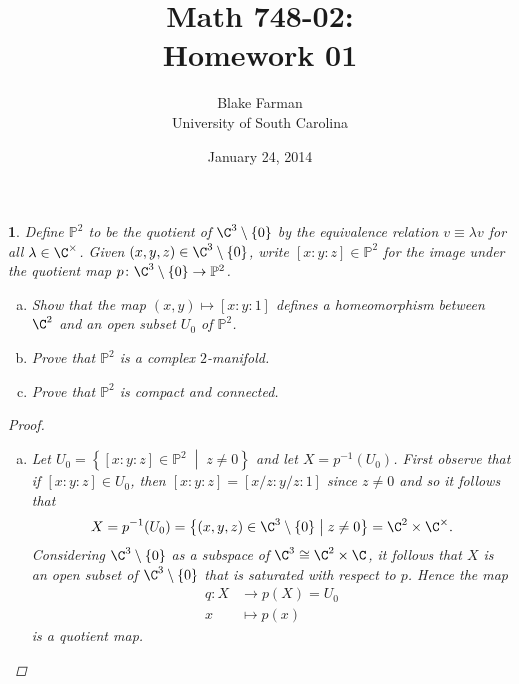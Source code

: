 \documentclass[10pt]{amsart}
\author{Blake Farman\\University of South Carolina}
\title{Math 748-02:\\Homework 01}
\date{January 24, 2014}
\begin{document}
\maketitle

\providecommand{\p}{\mathfrak{p}}
\providecommand{\m}{\mathfrak{m}}
\providecommand{\Deck}[1]{\operatorname{Deck}\left(#1\right)}

\newtheorem{thm}{}
\newtheorem{lem}{Lemma}
\newtheorem{prop}{Proposition}
\theoremstyle{definition}
\newtheorem{defn}{Definition}[thm]

\newcommand{\A}{\mathbb{A}}

\begin{thm}
  Define $\mathbb{P}^2$ to be the quotient of $\C^3 \setminus\{0\}$ by the equivalence relation $v \equiv \lambda v$ for all $\lambda \in \C^\times$.
  Given $(x, y, z) \in \C^3 \setminus \{0\}$, write $[x : y : z] \in \mathbb{P}^2$ for the image under the quotient map $p \colon \C^3 \setminus \{0\} \rightarrow \mathbb{P}^2$.
  \begin{enumerate}[(a)]
  \item
    Show that the map $(x, y) \mapsto [x : y : 1]$ defines a homeomorphism between $\C^2$ and an open subset $U_0$ of $\mathbb{P}^2$.
  \item
    Prove that $\mathbb{P}^2$ is a complex $2$-manifold.
  \item
    Prove that $\mathbb{P}^2$ is compact and connected.
  \end{enumerate}

  \begin{proof}
    \begin{enumerate}[(a)]
    \item
      Let $U_0 = \left\{ [x : y : z] \in \mathbb{P}^2 \;\middle\vert\; z \neq 0 \right\}$ and let $X = p^{-1}(U_0)$.
      First observe that if $[x : y : z] \in U_0$, then $[x : y : z] = [x/z : y/z : 1]$ since $z \neq 0$ and so it follows that
      $$X = p^{-1}(U_0) = \left\{(x, y, z) \in \C^3 \setminus \{0\} \;\middle\vert\; z \neq 0\right\} = \C^2 \times \C^\times.$$
      Considering $\C^3\setminus \{0\}$ as a subspace of $\C^3 \cong \C^2 \times \C$, it follows that $X$ is an open subset of $\C^3\setminus \{0\}$ that is saturated with respect to $p$.
      Hence the map
      \begin{align*}
        q \colon X &\rightarrow p(X) = U_0\\
        x &\mapsto p(x)
      \end{align*}
      is a quotient map.
      

\end{enumerate}
\end{proof}
\end{thm}
\end{document}
